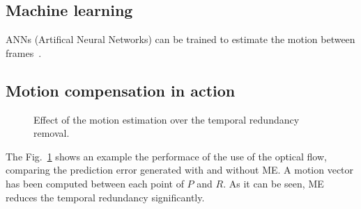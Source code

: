 \subsection{Machine learning}
ANNs (Artifical Neural Networks) can be trained to estimate the
motion between frames~\cite{dosovitskiy2015flownet}.

\subsection{Motion compensation in action}
\begin{figure}
  \caption{Effect of the motion estimation over the temporal redundancy removal.}
  \label{fig:MC}
\end{figure}
The Fig.~\ref{fig:MC} shows an example the performace of the use of
the optical flow, comparing the prediction error generated with and
without ME. A motion vector has been computed between each point of
$P$ and $R$. As it can be seen, ME reduces the temporal redundancy
significantly.

